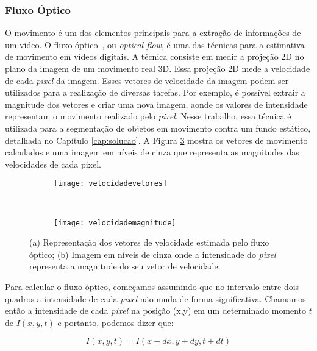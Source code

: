 \subsubsection{Fluxo Óptico}\label{sec:fluxooptico}

O movimento é um dos elementos principais para a extração de informações de um vídeo. O fluxo óptico~\cite{mota2011tensor}, ou \textit{optical flow}, é uma das técnicas para a estimativa de movimento em vídeos digitais. A técnica consiste em medir a projeção 2D no plano da imagem de um movimento real 3D. Essa projeção 2D mede a velocidade de cada \textit{pixel} da imagem. Esses vetores de velocidade da imagem podem ser utilizados para a realização de diversas tarefas. Por exemplo, é possível extrair a magnitude dos vetores e criar uma nova imagem, aonde os valores de intensidade representam o movimento realizado pelo \textit{pixel}. Nesse trabalho, essa técnica é utilizada para a segmentação de objetos em movimento contra um fundo estático, detalhada no Capítulo \ref{cap:solucao}. A Figura \ref{fig:fluxo} mostra os vetores de movimento calculados e uma imagem em níveis de cinza que representa as magnitudes das velocidades de cada pixel.

\begin{figure}
 \centering
\begin{subfigure}{.5\textwidth}
  \centering
  \texttt{[image: velocidadevetores]}
	\caption{}
	\label{fig:fluxo:sub:vetores}
	\centering
\end{subfigure}\
\begin{subfigure}{.5\textwidth}
  \centering
  \texttt{[image: velocidademagnitude]}
	\caption{}
	\label{fig:fluxo:sub:magnitude}
	\centering
\end{subfigure}
\caption{(a) Representação dos vetores de velocidade estimada pelo fluxo óptico; (b) Imagem em níveis de cinza onde a intensidade do \textit{pixel} representa a magnitude do seu vetor de velocidade.}
\label{fig:fluxo}
\centering
\end{figure}

Para calcular o fluxo óptico, começamos assumindo que no intervalo entre dois quadros a intensidade de cada \textit{pixel} não muda de forma significativa. Chamamos então a intensidade de cada \textit{pixel} na posição (x,y) em um determinado momento $t$ de $I(x,y,t)$ e portanto, podemos dizer que: 

\begin{equation}
	I(x,y,t) = I(x+dx, y+dy, t+dt)
\label{eq:fluxo1}
\end{equation} 

